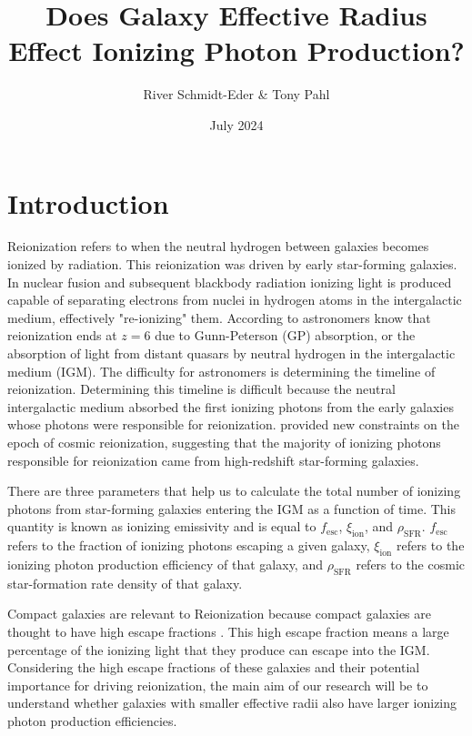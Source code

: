 \documentclass{article}
\title{Does Galaxy Effective Radius Effect Ionizing Photon Production?}
\author{River Schmidt-Eder \& Tony Pahl}
\date{July 2024}
\begin{document}
\maketitle

\section{Introduction}

Reionization refers to when the neutral hydrogen between galaxies becomes ionized by radiation. This reionization was driven by early star-forming galaxies. In nuclear fusion and subsequent blackbody radiation ionizing light is produced capable of separating electrons from nuclei in hydrogen atoms in the intergalactic medium, effectively "re-ionizing" them. According to \cite{2006ARA&A..44..415F} astronomers know that reionization ends at \(z = 6\) due to Gunn-Peterson (GP) absorption, or the absorption of light from distant quasars by neutral hydrogen in the intergalactic medium (IGM). The difficulty for astronomers is determining the timeline of reionization. Determining this timeline is difficult because the neutral intergalactic medium absorbed the first ionizing photons from the early galaxies whose photons were responsible for reionization. \cite{2015ApJ...802L..19R} provided new constraints on the epoch of cosmic reionization, suggesting that the majority of ionizing photons responsible for reionization came from high-redshift star-forming galaxies.

There are three parameters that help us to calculate the total number of ionizing photons from star-forming galaxies entering the IGM as a function of time. This quantity is known as ionizing emissivity and is equal to \(f_{\text{esc}}\), \(\xi_{\text{ion}}\), and \(\rho_{\text{SFR}}\). \( f_{\text{esc}} \) refers to the fraction of ionizing photons escaping a given galaxy, \(\xi_{\text{ion}}\) refers to the ionizing photon production efficiency of that galaxy, and \(\rho_{\text{SFR}}\) refers to the cosmic star-formation rate density of that galaxy.


Compact galaxies are relevant to Reionization because compact galaxies are thought to have high escape fractions \cite{2022ApJS..260....1F}. This high escape fraction means a large percentage of the ionizing light that they produce can escape into the IGM. Considering the high escape fractions of these galaxies and their potential importance for driving reionization, the main aim of our research will be to understand whether galaxies with smaller effective radii also have larger ionizing photon production efficiencies.
\end{document}

